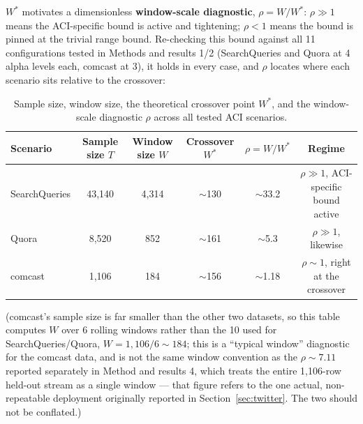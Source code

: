 \documentclass[11pt]{article}
\newenvironment{fittab}{\begin{lrbox}{\fittabbox}}{\end{lrbox}%
  \ifdim\wd\fittabbox>\linewidth\resizebox{\linewidth}{!}{\usebox{\fittabbox}}\else\usebox{\fittabbox}\fi}
\begin{document}
$W^*$ motivates a dimensionless \textbf{window-scale diagnostic}, $\rho = W/W^*$: $\rho \gg 1$ means the ACI-specific bound is active and tightening; $\rho < 1$ means the bound is pinned at the trivial range bound. Re-checking this bound against all 11 configurations tested in Methods and results 1/2 (SearchQueries and Quora at 4 alpha levels each, comcast at 3), it holds in every case, and $\rho$ locates where each scenario sits relative to the crossover:

\begin{table}[h]
\centering
\small
\begin{fittab}\begin{tabular}{@{}lccccc@{}}
\toprule
\textbf{Scenario} & \textbf{Sample size $T$} & \textbf{Window size $W$} & \textbf{Crossover $W^*$} & \textbf{$\rho=W/W^*$} & \textbf{Regime} \\
\midrule
SearchQueries & 43,140 & 4,314 & $\sim$130 & $\sim$33.2 & $\rho \gg 1$, ACI-specific bound active \\
Quora & 8,520 & 852 & $\sim$161 & $\sim$5.3 & $\rho \gg 1$, likewise \\
comcast & 1,106 & 184 & $\sim$156 & $\sim$1.18 & $\rho \sim 1$, right at the crossover \\
\bottomrule
\end{tabular}\end{fittab}
\caption{Sample size, window size, the theoretical crossover point $W^*$, and the window-scale diagnostic $\rho$ across all tested ACI scenarios.}
\end{table}

(comcast's sample size is far smaller than the other two datasets, so this table computes $W$ over 6 rolling windows rather than the 10 used for SearchQueries/Quora, $W = 1{,}106/6 \sim 184$; this is a ``typical window'' diagnostic for the comcast data, and is not the same window convention as the $\rho \sim 7.11$ reported separately in Method and results 4, which treats the entire 1,106-row held-out stream as a single window --- that figure refers to the one actual, non-repeatable deployment originally reported in Section~\ref{sec:twitter}. The two should not be conflated.)
\end{document}
